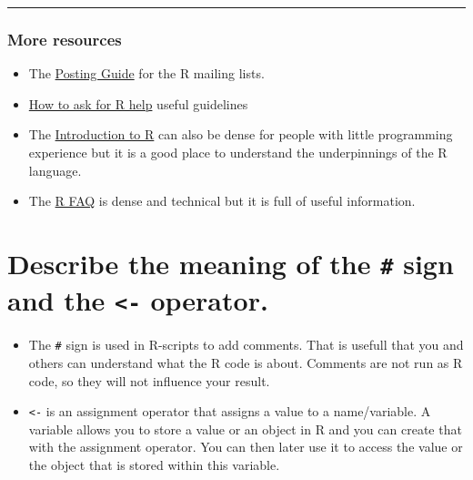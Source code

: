 \documentclass[
]{article}
\providecommand{\tightlist}{%
  \setlength{\itemsep}{0pt}\setlength{\parskip}{0pt}}
\begin{document}
\begin{center}\rule{0.5\linewidth}{0.5pt}\end{center}

\hypertarget{more-resources}{%
\subsubsection{More resources}\label{more-resources}}

\begin{itemize}
\tightlist
\item
  The \href{http://www.r-project.org/posting-guide.html}{Posting Guide}
  for the R mailing lists.
\item
  \href{http://blog.revolutionanalytics.com/2014/01/how-to-ask-for-r-help.html}{How
  to ask for R help} useful guidelines
\item
  The
  \href{http://cran.r-project.org/doc/manuals/R-intro.pdf}{Introduction
  to R} can also be dense for people with little programming experience
  but it is a good place to understand the underpinnings of the R
  language.
\item
  The \href{http://cran.r-project.org/doc/FAQ/R-FAQ.html}{R FAQ} is
  dense and technical but it is full of useful information.
\end{itemize}

\hypertarget{describe-the-meaning-of-the-sign-and-the---operator.}{%
\section{\texorpdfstring{Describe the meaning of the \texttt{\#} sign
and the \texttt{\textless{}-}
operator.}{Describe the meaning of the \# sign and the \textless- operator.}}\label{describe-the-meaning-of-the-sign-and-the---operator.}}

\begin{itemize}
\tightlist
\item
  The \texttt{\#} sign is used in R-scripts to add comments. That is
  usefull that you and others can understand what the R code is about.
  Comments are not run as R code, so they will not influence your
  result.
\item
  \texttt{\textless{}-} is an assignment operator that assigns a value
  to a name/variable. A variable allows you to store a value or an
  object in R and you can create that with the assignment operator. You
  can then later use it to access the value or the object that is stored
  within this variable.
\end{itemize}
\end{document}
